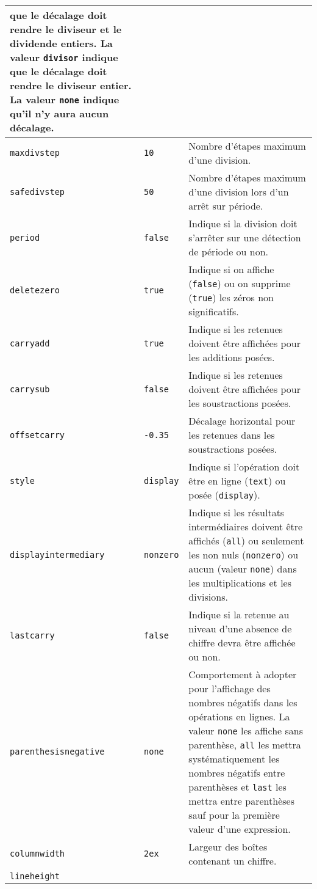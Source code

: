 \documentclass[12pt]{report}
\begin{document}
\begin{longtable}{|l|l|p{7cm}|}
  que le décalage doit rendre le diviseur et le dividende
  entiers. La valeur \verb+divisor+ indique que le décalage
  doit rendre le diviseur entier. La valeur \verb+none+ indique
  qu'il n'y aura aucun décalage. \\\hline
  \verb+maxdivstep+ &
  \verb+10+ &
  Nombre d'étapes maximum d'une division. \\\hline
  \verb+safedivstep+ &
  \verb+50+ &
  Nombre d'étapes maximum d'une division lors d'un arrêt sur
  période. \\\hline
  \verb+period+ &
  \verb+false+ &
  Indique si la division doit s'arrêter sur une détection de période
  ou non. \\\hline
  \verb+deletezero+ &
  \verb+true+ &
  Indique si on affiche (\verb+false+) ou on supprime
  (\verb+true+) les zéros non significatifs. \\\hline
  \verb+carryadd+ &
  \verb+true+ &
  Indique si les retenues doivent être affichées pour les additions
  posées. \\\hline
  \verb+carrysub+ &
  \verb+false+ &
  Indique si les retenues doivent être affichées pour les
  soustractions posées. \\\hline
  \verb+offsetcarry+ &
  \verb+-0.35+ &
  Décalage horizontal pour les retenues dans les
  soustractions posées. \\\hline
  \verb+style+ &
  \verb+display+ &
  Indique si l'opération doit être en ligne (\verb+text+) ou
  posée (\verb+display+). \\\hline
  \verb+displayintermediary+ &
  \verb+nonzero+ &
  Indique si les résultats intermédiaires doivent être affichés
  (\verb+all+) ou seulement les non nuls (\verb+nonzero+) ou
  aucun (valeur \verb+none+) dans les multiplications et les
  divisions. \\\hline
  \verb+lastcarry+ &
  \verb+false+ &
  Indique si la retenue au niveau d'une absence de chiffre devra
  être affichée ou non. \\\hline
  \verb+parenthesisnegative+ &
  \verb+none+ &
  Comportement à adopter pour l'affichage des nombres
  négatifs dans les opérations en lignes. La valeur \verb+none+
  les affiche sans parenthèse, \verb+all+ les mettra
  systématiquement les nombres négatifs entre parenthèses et
  \verb+last+ les mettra entre parenthèses
  sauf pour la première valeur d'une expression. \\\hline
  \verb+columnwidth+ &
  \verb+2ex+ &
  Largeur des boîtes contenant un chiffre. \\\hline
  \verb+lineheight+ &

\end{longtable}
\end{document}
